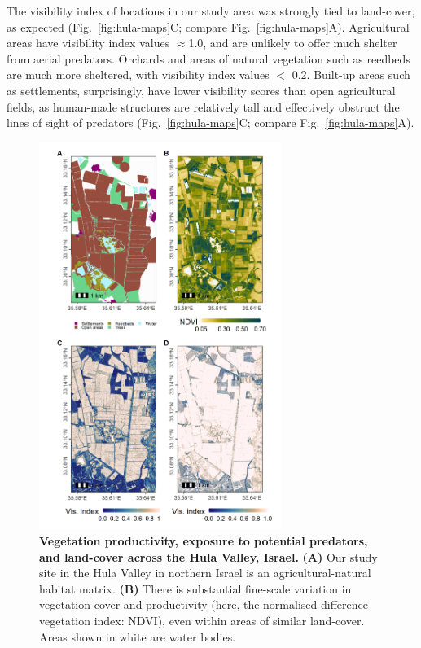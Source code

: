 The visibility index of locations in our study area was strongly tied to land-cover, as expected (Fig.~\ref{fig:hula-maps}C; compare Fig.~\ref{fig:hula-maps}A).
Agricultural areas have visibility index values $\approx$1.0, and are unlikely to offer much shelter from aerial predators.
Orchards and areas of natural vegetation such as reedbeds are much more sheltered, with visibility index values $<$ 0.2.
Built-up areas such as settlements, surprisingly, have lower visibility scores than open agricultural fields, as human-made structures are relatively tall and effectively obstruct the lines of sight of predators (Fig.~\ref{fig:hula-maps}C; compare Fig.~\ref{fig:hula-maps}A).

\begin{figure}
    \centering
    \includegraphics[width=0.7\textwidth]{figures/holeybirds/fig_spm_02}
    \caption{
        \textbf{Vegetation productivity, exposure to potential predators, and land-cover across the Hula Valley, Israel.}
        \textbf{(A)} Our study site in the Hula Valley in northern Israel is an agricultural-natural habitat matrix.
        \textbf{(B)} There is substantial fine-scale variation in vegetation cover and productivity (here, the normalised difference vegetation index: NDVI), even within areas of similar land-cover. Areas shown in white are water bodies.
}
\end{figure}
